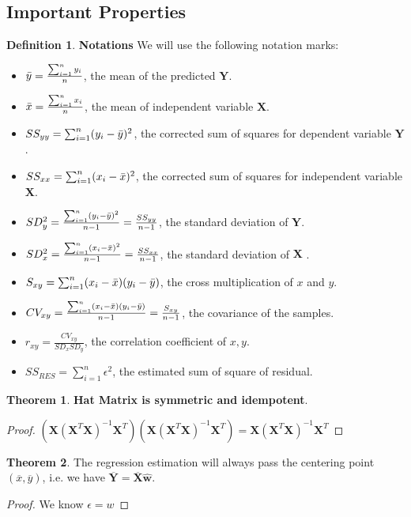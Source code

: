 \documentclass{article}
\theoremstyle{definition}
\newtheorem{defi}{Definition}[subsection]
\newtheorem{theorem}{Theorem}[subsection]
\begin{document}
\subsection{Important Properties}
\begin{defi}
\textbf{Notations} We will use the following notation marks:
\begin{itemize}
    \item $\Bar{y}=\frac{\sum_{i=1}^{n}y_i}{n}$, the mean of the predicted $\textbf{Y}$.
    \item $\Bar{x}=\frac{\sum_{i=1}^{n}x_i}{n}$, the mean of independent variable $\textbf{X}$.
    \item $SS_{yy}=\sum_{i=1}^{n}(y_i-\Bar{y})^2$, the corrected sum of squares for dependent variable $\textbf{Y}$.
    \item $SS_{xx}=\sum_{i=1}^{n}(x_i-\Bar{x})^2$, the corrected sum of squares for independent variable $\textbf{X}$.
    \item $SD_y^{2}=\frac{\sum_{i=1}^{n}(y_i-\Bar{y})^2}{n-1}=\frac{SS_{yy}}{n-1}$, the standard deviation of $\textbf{Y}$.
    \item $SD_x^{2}=\frac{\sum_{i=1}^{n}(x_i-\Bar{x})^2}{n-1}=\frac{SS_{xx}}{n-1}$, the standard deviation of $\textbf{X
    }$.
    \item $S_{xy}=\sum_{i=1}^{n}(x_i-\Bar{x})(y_i-\Bar{y})$, the cross multiplication of $x$ and $y$.
    \item $CV_{xy}=\frac{\sum_{i=1}^{n}(x_i-\Bar{x})(y_i-\Bar{y})}{n-1}=\frac{S_{xy}}{n-1}$, the covariance of the samples.
    \item $r_{xy}=\frac{CV_{xy}}{SD_xSD_y}$, the correlation coefficient of $x,y$.
    \item $SS_{RES}=\sum_{i=1}^{n}\epsilon^{2}$, the estimated sum of square of residual.
\end{itemize}
\end{defi}

\begin{theorem}
\textbf{Hat Matrix is symmetric and idempotent}.
\begin{proof}
$(\textbf{X}(\textbf{X}^{T}\textbf{X})^{-1}\textbf{X}^{T})(\textbf{X}(\textbf{X}^{T}\textbf{X})^{-1}\textbf{X}^{T})=\textbf{X}(\textbf{X}^{T}\textbf{X})^{-1}\textbf{X}^{T}$
\end{proof}
\end{theorem}

\begin{theorem}
The regression estimation will always pass the centering point $(\overline{x},\overline{y})$, i.e. we have $\overline{\textbf{Y}}=\overline{\textbf{X}}\hat{\textbf{w}}$.
\begin{proof}
We know $\epsilon = w$
\end{proof}
\end{theorem}
\end{document}

